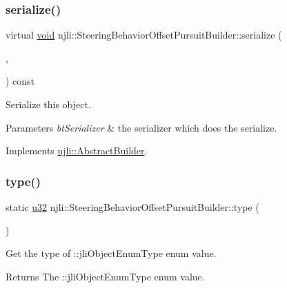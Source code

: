 \subsubsection{\texorpdfstring{serialize()}{serialize()}}
{\footnotesize\ttfamily virtual \mbox{\hyperlink{_thread_8h_af1e856da2e658414cb2456cb6f7ebc66}{void}} njli\+::\+Steering\+Behavior\+Offset\+Pursuit\+Builder\+::serialize (\begin{DoxyParamCaption}\item[{\mbox{\hyperlink{_thread_8h_af1e856da2e658414cb2456cb6f7ebc66}{void}} $\ast$}]{,  }\item[{bt\+Serializer $\ast$}]{ }\end{DoxyParamCaption}) const\hspace{0.3cm}{\ttfamily [virtual]}}

Serialize this object.


\begin{DoxyParams}{Parameters}
{\em bt\+Serializer} & the serializer which does the serialize. \\
\hline
\end{DoxyParams}


Implements \mbox{\hyperlink{classnjli_1_1_abstract_builder_ab66b774e02ccb9da554c9aab7fa6d981}{njli\+::\+Abstract\+Builder}}.

\mbox{\label{classnjli_1_1_steering_behavior_offset_pursuit_builder_a375489c6cd998b80d1283fa838384f12}} 
\subsubsection{\texorpdfstring{type()}{type()}}
{\footnotesize\ttfamily static \mbox{\hyperlink{_util_8h_a10e94b422ef0c20dcdec20d31a1f5049}{u32}} njli\+::\+Steering\+Behavior\+Offset\+Pursuit\+Builder\+::type (\begin{DoxyParamCaption}{ }\end{DoxyParamCaption})\hspace{0.3cm}{\ttfamily [static]}}

Get the type of \+::jli\+Object\+Enum\+Type enum value.

\begin{DoxyReturn}{Returns}
The \+::jli\+Object\+Enum\+Type enum value. 
\end{DoxyReturn}


